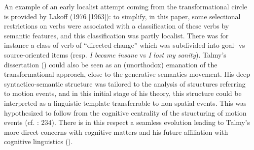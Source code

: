 \documentclass[output=paper]{langscibook}
\begin{document}
An example of an early localist attempt coming from the transformational circle is provided by Lakoff (1976 [1963]): to simplify, in this paper, some selectional restrictions on verbs were associated with a classification of these verbs by semantic features, and this classification was partly localist. There was for instance a class of verb of “directed change” which was subdivided into goal- vs source-oriented items (resp. \textit{I became insane} vs \textit{I lost my sanity}). Talmy’s dissertation (\citeyear{talmy_semantic_1972}) could also be seen as an (unorthodox) emanation of the transformational approach, close to the generative semantics movement. His deep syntactico-semantic structure was tailored to the analysis of structures referring to motion events, and in this initial stage of his theory, this structure could be interpreted as a linguistic template transferrable to non-spatial events. This was hypothesized to follow from the cognitive centrality of the structuring of motion events (cf. \citealt{kimball_semantics_1975}: 234). There is in this respect a seamless evolution leading to Talmy’s more direct concerns with cognitive matters and his future affiliation with cognitive linguistics (\citealt{fortis_morpho-syntax_2016}).
\end{document}
